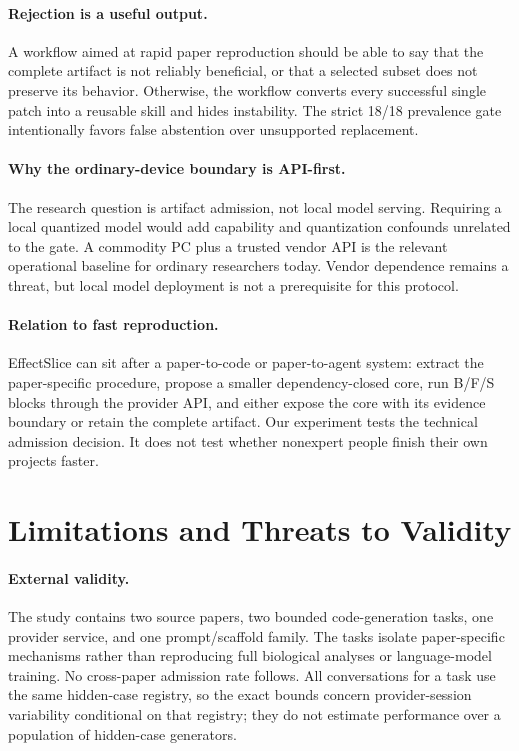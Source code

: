 \documentclass[letterpaper]{article} %
\begin{document}
\paragraph{Rejection is a useful output.}
A workflow aimed at rapid paper reproduction should be able to say that the
complete artifact is not reliably beneficial, or that a selected subset does
not preserve its behavior.  Otherwise, the workflow converts every successful
single patch into a reusable skill and hides instability.  The strict 18/18
prevalence gate intentionally favors false abstention over unsupported
replacement.

\paragraph{Why the ordinary-device boundary is API-first.}
The research question is artifact admission, not local model serving.  Requiring
a local quantized model would add capability and quantization confounds
unrelated to the gate.  A commodity PC plus a trusted vendor API is the relevant
operational baseline for ordinary researchers today.  Vendor dependence remains
a threat, but local model deployment is not a prerequisite for this protocol.

\paragraph{Relation to fast reproduction.}
EffectSlice can sit after a paper-to-code or paper-to-agent system: extract the
paper-specific procedure, propose a smaller dependency-closed core, run B/F/S
blocks through the provider API, and either expose the core with its evidence
boundary or retain the complete artifact.  Our experiment tests the technical
admission decision.  It does not test whether nonexpert people finish their own
projects faster.

\section{Limitations and Threats to Validity}

\paragraph{External validity.}
The study contains two source papers, two bounded code-generation tasks, one
provider service, and one prompt/scaffold family.  The tasks isolate
paper-specific mechanisms rather than reproducing full biological analyses or
language-model training.  No cross-paper admission rate follows.
All conversations for a task use the same hidden-case registry, so the exact
bounds concern provider-session variability conditional on that registry; they
do not estimate performance over a population of hidden-case generators.
\end{document}
